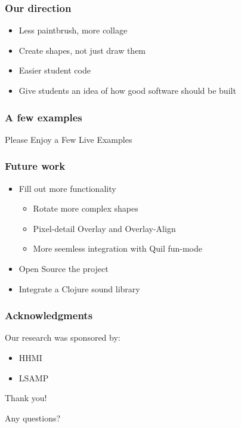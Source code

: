 \documentclass{beamer}
\begin{document}

\begin{frame}
	\frametitle{Our direction}
	\begin{itemize}
		\item Less paintbrush, more collage
		\item Create shapes, not just draw them
		\item Easier student code
		\item Give students an idea of how good software should be built              
	\end{itemize}
\end{frame}

\begin{frame}
	\frametitle{A few examples}
	 Please Enjoy a Few Live Examples
\end{frame}

\begin{frame}
	\frametitle{Future work}
	\begin{itemize}
		\item Fill out more functionality
		\begin{itemize}
			\item Rotate more complex shapes
			\item Pixel-detail Overlay and Overlay-Align
			\item More seemless integration with Quil fun-mode
		\end{itemize}
		\item Open Source the project
		\item Integrate a Clojure sound library
	\end{itemize}
\end{frame}

\begin{frame}
\frametitle{Acknowledgments}
	Our research was sponsored by:
	\begin{itemize}
	\item HHMI
	\item LSAMP
	\end{itemize}
	{\centering
	\noindent
	Thank you! \par
	Any questions? \par
	}
\end{frame}
\end{document}
